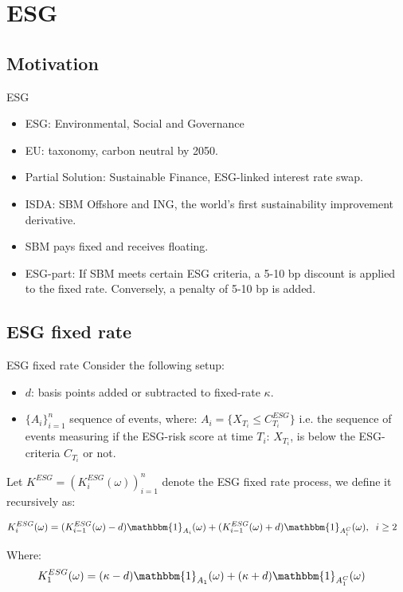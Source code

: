 \documentclass[UKenglish]{beamer}
\begin{document}
\section{ESG}

\subsection{Motivation}
\begin{frame}{ESG}
\begin{itemize}
    \item ESG: Environmental, Social and Governance
    \item EU: taxonomy, carbon neutral by 2050. 
    \item Partial Solution: Sustainable Finance,
          ESG-linked interest rate swap. 
    \item ISDA: SBM Offshore and ING, the world's first sustainability improvement derivative. 
    \item SBM pays fixed and receives floating. 
    \item ESG-part: If SBM meets certain ESG criteria, a 5-10 bp discount is applied to the fixed rate. Conversely, a penalty of 5-10 bp is added.  
\end{itemize}
\end{frame}


\subsection{ESG fixed rate}

\begin{frame}{ESG fixed rate}
Consider the following setup: 
\begin{itemize}
    \item $d$: basis points added or subtracted to fixed-rate $\kappa$. 
    \item $\{A_{i}\}_{i=1}^{n}$ sequence of events, where: 
    $A_{i} = \{X_{T_{i}} \leq C_{T_{i}}^{ESG}\}$
    i.e. the sequence of events measuring if the ESG-risk score at time $T_{i}$: $X_{T_{i}}$, is below the ESG-criteria $C_{T_{i}}$ or not. 
\end{itemize}

\begin{definition}
Let $K^{ESG} = (K_{i}^{ESG}(\omega))_{i=1}^{n}$ 
denote the ESG fixed rate process, we define it recursively as: 

\begin{align*}
K_{i}^{ESG}(\omega) &= (K_{i-1}^{ESG}(\omega)-d)\mathbbm{1}_{A_{i}}(\omega)
+ (K_{i-1}^{ESG}(\omega)+d)\mathbbm{1}_{A_{i}^{C}}(\omega), \;\; i\geq 2
\end{align*}

Where:
\begin{align*}
K_{1}^{ESG}(\omega) &= (\kappa - d)\mathbbm{1}_{A_{1}}(\omega)
+ (\kappa + d)\mathbbm{1}_{A_{1}^{C}}(\omega)    
\end{align*}
\end{definition}

\end{frame}
\end{document}
